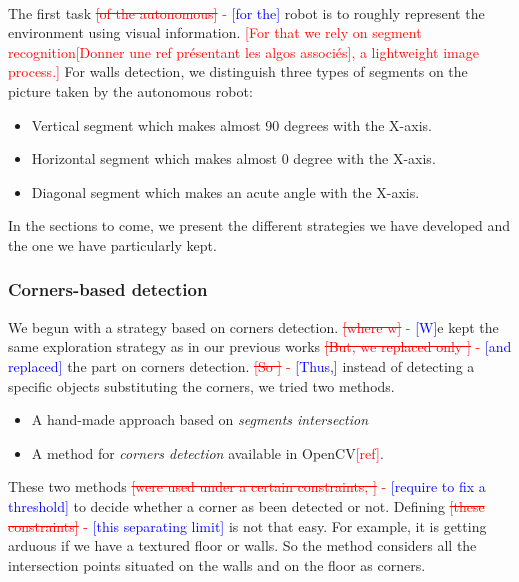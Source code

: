 \documentclass[12pt]{report}
\newcommand{\hcr}[2]{\textcolor{red}{\sout{[#1]} - \textcolor{blue}{ [#2]}}}
\newcommand{\hc}[1]{\textcolor{red}{[#1]}}
\begin{document}
	 \paragraph{}
	 The first task \hcr{of the autonomous}{for the} robot is to roughly represent the environment using visual 
information. \hc{For that we rely on segment recognition\hc{Donner une ref présentant les algos associés}, a 
lightweight image process.} For walls detection, we distinguish three types of segments on the picture taken by the 
autonomous robot:
	 \begin{itemize}
	 	\item Vertical segment which makes almost 90 degrees with the X-axis.
	 	\item Horizontal segment which makes almost 0 degree with the  X-axis.
	 	\item Diagonal segment which makes an acute angle with the X-axis.
	 \end{itemize} 
	 
	 In the sections to come, we present the different strategies we have developed and the one we have particularly kept.
	 
	 \subsubsection{Corners-based detection}
	 
	 We begun with a strategy based on corners detection. \hcr{where w}{W}e kept the same exploration strategy as 
in our previous works \hcr{But, we replaced only }{and replaced} the part on corners detection. \hcr{So }{Thus,} 
instead of detecting a specific objects substituting the corners, we tried two methods. 
\begin{itemize}
 \item A hand-made approach based on \textit{segments intersection}
 \item A method for \textit{corners detection} available in OpenCV\hc{ref}.
\end{itemize}
These two methods \hcr{were used under a certain constraints, }{require to fix a threshold} to decide whether a corner 
as been detected or not. Defining \hcr{these constraints}{this separating limit} is not that easy. For example, it is 
getting arduous if we have a textured floor or walls. So the method considers all the intersection points situated on 
the walls and on the floor as corners.\\
	
\end{document}
